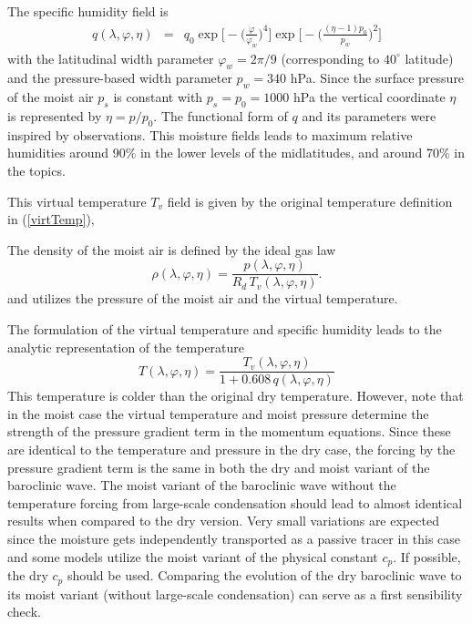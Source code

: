 \documentclass[times,doublespace]{fldauth}
\begin{document}
The specific humidity field is 
\begin{eqnarray}
q(\lambda, \varphi, \eta) &=& q_0 \exp\Bigg[- \Big(\frac{\varphi}{\varphi_{w}}\Big)^4 \Bigg] \exp\Bigg[- \Bigg(\frac{(\eta-1)p_0}{p_{w}}\Bigg)^2  \Bigg]
\end{eqnarray}
with the latitudinal width parameter $\varphi_{w} = 2 \pi / 9$ (corresponding to $40^\circ$ latitude) and the pressure-based width parameter $p_w = 340$ hPa. Since the surface pressure of the moist air $p_s$ is constant with $p_s = p_0 = 1000$ hPa  the vertical coordinate $\eta$ is represented by $\eta = p/p_0$. The functional form of $q$ and its parameters were inspired by observations. This moisture fields leads to maximum relative humidities around 90\% in the lower levels of the midlatitudes, and around 70\% in the topics.

This virtual temperature $T_v$ field is given by the original temperature definition in (\ref{virtTemp}),

The density of the moist air is defined by the ideal gas law
\begin{equation} \label{eq:density_test4m}
\rho(\lambda, \varphi, \eta) = \frac{p(\lambda, \varphi, \eta)}{R_d \,T_v(\lambda, \varphi, \eta)}.
\end{equation} 
and utilizes the pressure of the moist air and the virtual temperature.

The formulation of the virtual temperature and specific humidity leads to the analytic representation of the temperature
\begin{equation}
\label{test42:T}
T(\lambda,\varphi,\eta) = \frac{T_v(\lambda,\varphi,\eta)}{1+0.608 \,q(\lambda, \varphi, \eta)}
\end{equation}
This temperature is colder than the original dry temperature. However, note that in the moist case the virtual temperature and moist pressure determine the strength of the pressure gradient term in the momentum equations. Since these are identical to the temperature and pressure in the dry case, the forcing by the pressure gradient term is the same in both the dry and moist variant of the baroclinic wave. The moist variant of the baroclinic wave without the temperature forcing from large-scale condensation should lead to almost identical results when compared to the dry version. Very small variations are expected since the moisture gets independently transported as a passive tracer in this case and some models utilize the moist variant of the physical constant $c_p$. If possible, the dry $c_p$ should be used. Comparing the evolution of the dry baroclinic wave to its moist variant (without large-scale condensation) can serve as a first sensibility check.
\end{document}
